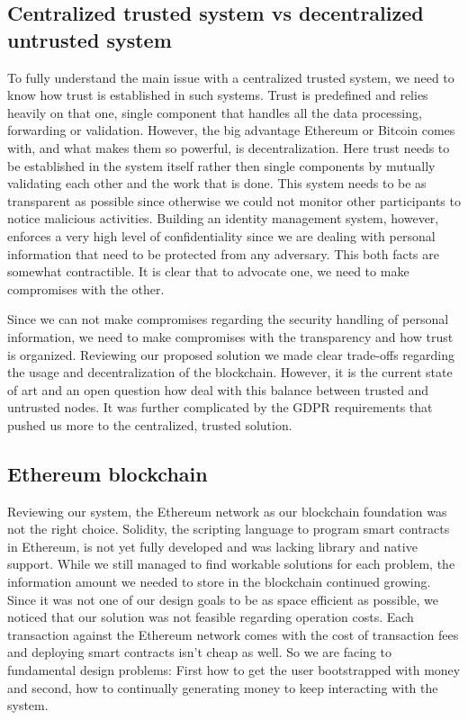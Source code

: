 \subsection{Centralized trusted system vs decentralized untrusted system}
To fully understand the main issue with a centralized trusted system, we need to know how trust is established in such systems. Trust is predefined and relies heavily on that one, single component that handles all the data processing, forwarding or validation. However, the big advantage Ethereum or Bitcoin comes with, and what makes them so powerful, is decentralization.  Here trust needs to be established in the system itself rather then single components by mutually validating each other and the work that is done.  This system needs to be as transparent as possible since otherwise we could not monitor other participants to notice malicious activities. Building an identity management system, however, enforces a very high level of confidentiality since we are dealing with personal information that need to be protected from any adversary. This both facts are somewhat contractible. It is clear that to advocate one, we need to make compromises with the other. 

Since we can not make compromises regarding the security handling of personal information, we need to make compromises with the transparency and how trust is organized. Reviewing our proposed solution we made clear trade-offs regarding the usage and decentralization of the blockchain. However, it is the current state of art and an open question how deal with this balance between trusted and untrusted nodes. It was further complicated by the GDPR requirements that pushed us more to the centralized, trusted solution. 

\subsection{Ethereum blockchain}
Reviewing our system, the Ethereum network as our blockchain foundation was not the right choice. Solidity, the scripting language to program smart contracts in Ethereum, is not yet fully developed and was lacking library and native support. While we still managed to find workable solutions for each problem, the information amount we needed to store in the blockchain continued growing. Since it was not one of our design goals to be as space efficient as possible, we noticed that our solution was not feasible regarding operation costs. Each transaction against the Ethereum network comes with the cost of transaction fees and deploying smart contracts isn’t cheap as well. So we are facing to fundamental design problems: First how to get the user bootstrapped with money and second, how to continually generating money to keep interacting with the system.

